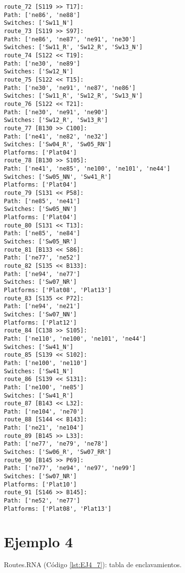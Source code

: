\begin{lstlisting}[language = {}, tabsize=4, basicstyle=\footnotesize\ttfamily, showspaces=false, showstringspaces=false, caption = Routes.RNA, label = {lst:EJ3_7}]
route_72 [S119 >> T17]:
Path: ['ne86', 'ne88']	
Switches: ['Sw11_N']
route_73 [S119 >> S97]:
Path: ['ne86', 'ne87', 'ne91', 'ne30']
Switches: ['Sw11_R', 'Sw12_R', 'Sw13_N']
route_74 [S122 << T19]:
Path: ['ne30', 'ne89']
Switches: ['Sw12_N']
route_75 [S122 << T15]:
Path: ['ne30', 'ne91', 'ne87', 'ne86']
Switches: ['Sw11_R', 'Sw12_R', 'Sw13_N']
route_76 [S122 << T21]:
Path: ['ne30', 'ne91', 'ne90']
Switches: ['Sw12_R', 'Sw13_R']
route_77 [B130 >> C100]:
Path: ['ne41', 'ne82', 'ne32']
Switches: ['Sw04_R', 'Sw05_RN']
Platforms: ['Plat04']
route_78 [B130 >> S105]:	
Path: ['ne41', 'ne85', 'ne100', 'ne101', 'ne44']
Switches: ['Sw05_NN', 'Sw41_R']
Platforms: ['Plat04']
route_79 [S131 << P58]:
Path: ['ne85', 'ne41']
Switches: ['Sw05_NN']
Platforms: ['Plat04']
route_80 [S131 << T13]:
Path: ['ne85', 'ne84']
Switches: ['Sw05_NR']
route_81 [B133 << S86]:
Path: ['ne77', 'ne52']
route_82 [S135 << B133]:
Path: ['ne94', 'ne77']
Switches: ['Sw07_NR']
Platforms: ['Plat08', 'Plat13']
route_83 [S135 << P72]:
Path: ['ne94', 'ne21']
Switches: ['Sw07_NN']
Platforms: ['Plat12']
route_84 [C138 >> S105]:
Path: ['ne110', 'ne100', 'ne101', 'ne44']	
Switches: ['Sw41_N']
route_85 [S139 << S102]:
Path: ['ne100', 'ne110']
Switches: ['Sw41_N']
route_86 [S139 << S131]:
Path: ['ne100', 'ne85']
Switches: ['Sw41_R']
route_87 [B143 << L32]:
Path: ['ne104', 'ne70']
route_88 [S144 << B143]:
Path: ['ne21', 'ne104']
route_89 [B145 >> L33]:
Path: ['ne77', 'ne79', 'ne78']
Switches: ['Sw06_R', 'Sw07_RR']
route_90 [B145 >> P69]:
Path: ['ne77', 'ne94', 'ne97', 'ne99']
Switches: ['Sw07_NR']
Platforms: ['Plat10']
route_91 [S146 >> B145]:
Path: ['ne52', 'ne77']
Platforms: ['Plat08', 'Plat13']
	\end{lstlisting}	
	\section{Ejemplo 4}
	Routes.RNA (Código \ref{lst:EJ4_7}): tabla de enclavamientos.
	

